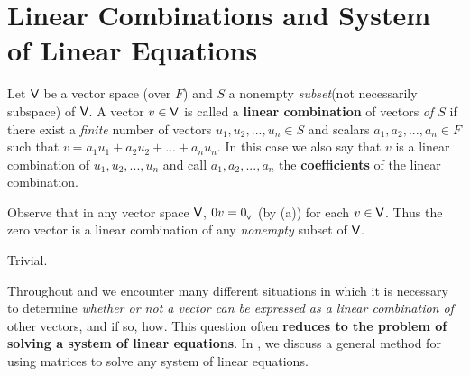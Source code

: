 \section{Linear Combinations and System of Linear Equations} \label{sec 1.4}

\begin{definition} \label{def 1.3}
Let \(\textsf{V}\) be a vector space (over \(F\)) and \(S\) a nonempty \emph{subset}(not necessarily subspace) of \(\textsf{V}\).
A vector \(v \in \textsf{V}\) is called a \textbf{linear combination} of vectors \emph{of \(S\)} if there exist a \emph{finite} number of vectors \(u_1, u_2, ..., u_n \in S\) and scalars \(a_1, a_2, ..., a_n \in F\) such that \(v = a_1 u_1 + a_2 u_2 + ... + a_n u_n\).
In this case we also say that \(v\) is a linear combination of \(u_1, u_2, ..., u_n\) and call \(a_1, a_2, ..., a_n\) the \textbf{coefficients}
of the linear combination.
\end{definition}

\begin{note}
Observe that in any vector space \(\textsf{V}\), \(0v = 0_{_{\textsf{V}}}\) (by (a)) for each \(v \in \textsf{V}\).
Thus the zero vector is a linear combination of any \emph{nonempty} subset of \(\textsf{V}\).
\end{note}

\begin{example}
Trivial.
\end{example}

Throughout  and  we encounter many different situations in which it is necessary to determine \emph{whether or not a vector can be expressed as a linear combination of} other vectors, and if so, how. 
This question often \textbf{reduces to the problem of solving a system of linear equations}.
In , we discuss a general method for using matrices to solve any system of linear equations.

